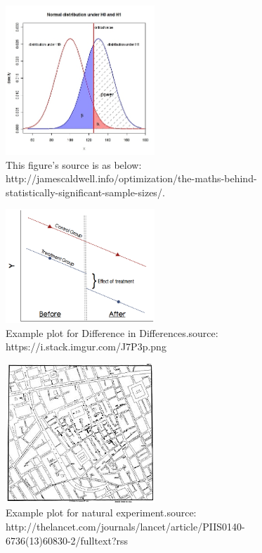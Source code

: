 \begin{figure}[ht]
  \begin{center}
    \includegraphics[width=0.5\textwidth]{rxoDS.jpg}
    \caption{
      This figure's source is as below: \newline http://jamescaldwell.info/optimization/the-maths-behind-statistically-significant-sample-sizes/.}
    \label{figure 1}
  \end{center}
\end{figure}


\begin{figure}[ht]
  \begin{center}
    \includegraphics[width=0.5\textwidth]{J7P3p.png}
        \caption{Example plot for Difference in Differences.\newline  source: https://i.stack.imgur.com/J7P3p.png}
    \label{figure 2}
  \end{center}
\end{figure}


\begin{figure}[ht]
  \begin{center}
    \includegraphics[width=0.5\textwidth]{330px-Snow-cholera-map-1.jpg}
        \caption{Example plot for natural experiment.\newline  source:  http://thelancet.com/journals/lancet/article/PIIS0140-6736(13)60830-2/fulltext?rss}
    \label{figure 3}
  \end{center}
\end{figure}

